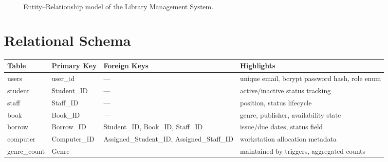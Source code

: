\documentclass[12pt]{article}
\begin{document}
\begin{figure}[H]
  \caption{Entity--Relationship model of the Library Management System.}
\end{figure}

\section{Relational Schema}
\begin{longtable}{@{}L{0.18\textwidth}L{0.18\textwidth}L{0.24\textwidth}L{0.3\textwidth}@{}}
\toprule
\textbf{Table} & \textbf{Primary Key} & \textbf{Foreign Keys} & \textbf{Highlights} \\
\midrule
users & user\_id & --- & unique email, bcrypt password hash, role enum \\
student & Student\_ID & --- & active/inactive status tracking \\
staff & Staff\_ID & --- & position, status lifecycle \\
book & Book\_ID & --- & genre, publisher, availability state \\
borrow & Borrow\_ID & Student\_ID, Book\_ID, Staff\_ID & issue/due dates, status field \\
computer & Computer\_ID & Assigned\_Student\_ID, Assigned\_Staff\_ID & workstation allocation metadata \\
genre\_count & Genre & --- & maintained by triggers, aggregated counts \\
\bottomrule
\end{longtable}
\end{document}
